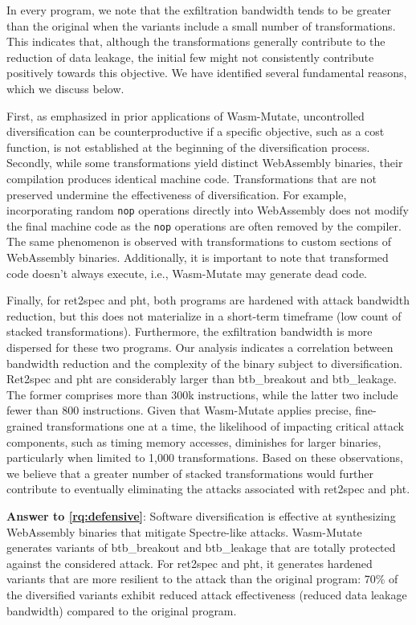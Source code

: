 \documentclass[a4paper,fleqn]{cas-dc}
\newcommand{\tool}{{\sc Wasm-Mutate}\xspace}
\newcommand{\Wasm}{WebAssembly\xspace}
\newcommand{\wasm}{\Wasm}
\begin{document}
In every program, we note that the exfiltration bandwidth tends to be greater than the original when the variants include a small number of transformations.
This indicates that, although the transformations generally contribute to the reduction of data leakage, the initial few might not consistently contribute positively towards this objective.
We have identified several fundamental reasons, which we discuss below.

First, as emphasized in prior applications of \tool \cite{CABRERAARTEAGA2023103296}, uncontrolled diversification can be counterproductive if a specific objective, such as a cost function, is not established at the beginning of the diversification process.
Secondly, while some transformations yield distinct \wasm binaries, their compilation produces identical machine code.
Transformations that are not preserved undermine the effectiveness of diversification.
For example, incorporating random \texttt{nop} operations directly into \wasm does not modify the final machine code as the \texttt{nop} operations are often removed by the compiler.
The same phenomenon is observed with transformations to custom sections of \Wasm binaries.
Additionally, it is important to note that transformed code doesn't always execute, i.e., \tool may generate dead code.

Finally, for ret2spec and pht, both programs are hardened with attack bandwidth reduction, but this does not materialize in a short-term timeframe (low count of stacked transformations).
Furthermore,  the exfiltration bandwidth is more dispersed for these two programs.
Our analysis indicates a correlation between bandwidth reduction and the complexity of the binary subject to diversification.
Ret2spec and pht are considerably larger than btb\_breakout and btb\_leakage.
The former comprises more than 300k instructions, while the latter two include fewer than 800 instructions.
Given that \tool applies precise, fine-grained transformations one at a time, the likelihood of impacting critical attack components, such as timing memory accesses, diminishes for larger binaries, particularly when limited to 1,000 transformations.
Based on these observations, we believe that a greater number of stacked transformations would further contribute to eventually eliminating the attacks associated with ret2spec and pht.


\begin{tcolorbox}[boxrule=1pt,arc=.3em,boxsep=-1.3mm]
  \textbf{Answer to \ref{rq:defensive}}:   Software diversification is effective at synthesizing \wasm binaries that mitigate Spectre-like attacks.  
  \tool generates variants of btb\_breakout and btb\_leakage that are totally protected against the considered attack. For ret2spec and pht, it generates hardened variants that are more resilient to the attack than the original program: 70\% of the diversified variants exhibit reduced attack effectiveness (reduced data leakage bandwidth) compared to the original program.
\end{tcolorbox}
\end{document}
